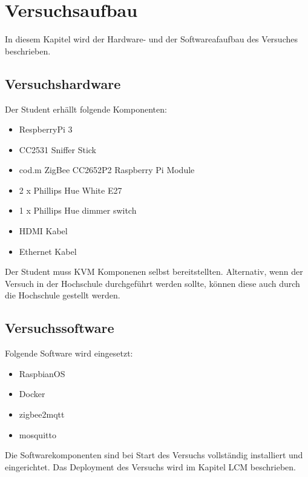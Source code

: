 \chapter{Versuchsaufbau}

In diesem Kapitel wird der Hardware- und der Softwareafaufbau des Versuches beschrieben.

\section{Versuchshardware}

Der Student erhällt folgende Komponenten:
\begin{itemize}
    \item RespberryPi 3
    \item CC2531 Sniffer Stick
    \item cod.m ZigBee CC2652P2 Raspberry Pi Module
    \item 2 x Phillips Hue White E27
    \item 1 x Phillips Hue dimmer switch
    \item HDMI Kabel
    \item Ethernet Kabel
\end{itemize}

Der Student muss KVM Komponenen selbst bereitstellten. Alternativ, wenn der Versuch in der Hochschule durchgeführt werden sollte,
können diese auch durch die Hochschule gestellt werden.

\section{Versuchssoftware}

Folgende Software wird eingesetzt:
\begin{itemize}
    \item RaspbianOS
    \item Docker
    \item zigbee2mqtt
    \item mosquitto
\end{itemize}

Die Softwarekomponenten sind bei Start des Versuchs vollständig installiert und eingerichtet. Das Deployment des
Versuchs wird im Kapitel LCM beschrieben.



